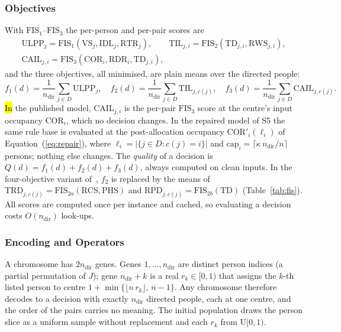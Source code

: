 \documentclass[systems,article,accept,moreauthors,pdftex]{Definitions/mdpi}
\begin{document}
\subsubsection{Objectives}
With $\mathrm{FIS}_1$--$\mathrm{FIS}_3$ the per-person and per-pair scores are
\begin{equation}\label{eq:scores}
\begin{gathered}
\mathrm{ULPP}_j=\mathrm{FIS}_1(\mathrm{VS}_j,\mathrm{IDL}_j,\mathrm{RTR}_j),\qquad
\mathrm{TIL}_{j,i}=\mathrm{FIS}_2(\mathrm{TD}_{j,i},\mathrm{RWS}_{j,i}),\\
\mathrm{CAIL}_{j,i}=\mathrm{FIS}_3(\mathrm{COR}_i,\mathrm{RDR}_i,\mathrm{TD}_{j,i}),
\end{gathered}
\end{equation}
and the three objectives, all minimised, are plain means over the directed people:
\begin{equation}\label{eq:objectives}
f_1(d)=\frac{1}{n_{\mathrm{dir}}}\sum_{j\in D}\mathrm{ULPP}_j,\quad
f_2(d)=\frac{1}{n_{\mathrm{dir}}}\sum_{j\in D}\mathrm{TIL}_{j,c(j)},\quad
f_3(d)=\frac{1}{n_{\mathrm{dir}}}\sum_{j\in D}\mathrm{CAIL}_{j,c(j)}.
\end{equation}
\hl{In} %
 the published model, $\mathrm{CAIL}_{j,i}$ is the per-pair $\mathrm{FIS}_3$ score at the
centre's input occupancy $\mathrm{COR}_i$, which no decision changes. In the repaired model of
S5 the same rule base is evaluated at the post-allocation occupancy
$\mathrm{COR}'_i(\ell_i)$ of Equation~(\ref{eq:repair}), where $\ell_i=|\{j\in D: c(j)=i\}|$ and
$\mathrm{cap}_i=\lceil\kappa\,n_{\mathrm{dir}}/n\rceil$ persons; nothing else changes. The
\emph{quality} of a decision is $Q(d)=f_1(d)+f_2(d)+f_3(d)$, always computed on clean inputs.
In the four-objective variant of~\cite{rabiei2026resilient}, $f_2$ is replaced by the means of
$\mathrm{TRD}_{j,c(j)}=\mathrm{FIS}_{2a}(\mathrm{RCS},\mathrm{PHS})$ and
\mbox{$\mathrm{RPD}_{j,c(j)}=\mathrm{FIS}_{2b}(\mathrm{TD})$} (Table~\ref{tab:fis}). All scores are
computed once per instance and cached, so evaluating a decision costs $O(n_{\mathrm{dir}})$
look-ups.

\subsubsection{Encoding and Operators}
A chromosome has $2n_{\mathrm{dir}}$ genes. Genes $1,\dots,n_{\mathrm{dir}}$ are distinct
person indices (a partial permutation of $J$); gene $n_{\mathrm{dir}}+k$ is a real
$r_k\in[0,1)$ that assigns the $k$-th listed person to centre
$1+\min\{\lfloor n\,r_k\rfloor,\,n-1\}$. Any chromosome therefore decodes to a decision with
exactly $n_{\mathrm{dir}}$ directed people, each at one centre, and the order of the pairs
carries no meaning. The initial population draws the person slice as a uniform sample
without replacement and each $r_k$ from $\mathrm{U}[0,1)$.
\end{document}

